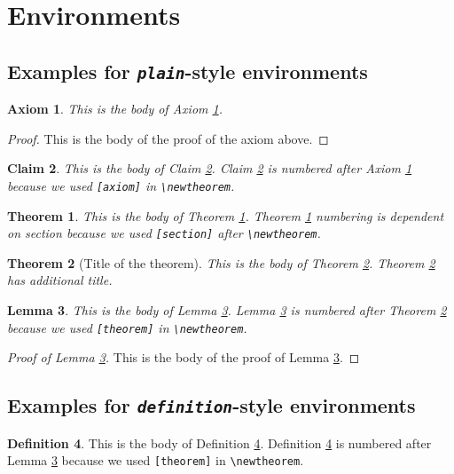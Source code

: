 \documentclass[ejsv2]{imsart}
\theoremstyle{plain}
\newtheorem{axiom}{Axiom}
\newtheorem{claim}[axiom]{Claim}
\newtheorem{theorem}{Theorem}[section]
\newtheorem{lemma}[theorem]{Lemma}
\theoremstyle{definition}
\newtheorem{definition}[theorem]{Definition}
\theoremstyle{remark}
\begin{document}
\section{Environments}

\subsection{Examples for \emph{\texttt{plain}}-style environments}
\begin{axiom}\label{ax1}
This is the body of Axiom \ref{ax1}.
\end{axiom}

\begin{proof}
This is the body of the proof of the axiom above.
\end{proof}

\begin{claim}\label{cl1}
This is the body of Claim \ref{cl1}. Claim \ref{cl1} is numbered after
Axiom \ref{ax1} because we used \verb|[axiom]| in \verb|\newtheorem|.
\end{claim}

\begin{theorem}\label{th1}
This is the body of Theorem \ref{th1}. Theorem \ref{th1} numbering is
dependent on section because we used \verb|[section]| after \verb|\newtheorem|.
\end{theorem}

\begin{theorem}[Title of the theorem]\label{th2}
This is the body of Theorem \ref{th2}. Theorem \ref{th2} has additional title.
\end{theorem}

\begin{lemma}\label{le1}
This is the body of Lemma \ref{le1}. Lemma \ref{le1} is numbered after
Theorem \ref{th2} because we used \verb|[theorem]| in \verb|\newtheorem|.
\end{lemma}


\begin{proof}[Proof of Lemma \ref{le1}]
This is the body of the proof of Lemma \ref{le1}.
\end{proof}

\subsection{Examples for \emph{\texttt{definition}}-style environments}
\begin{definition}\label{de1}
This is the body of Definition \ref{de1}. Definition \ref{de1} is numbered after
Lemma \ref{le1} because we used \verb|[theorem]| in \verb|\newtheorem|.
\end{definition}
\end{document}
